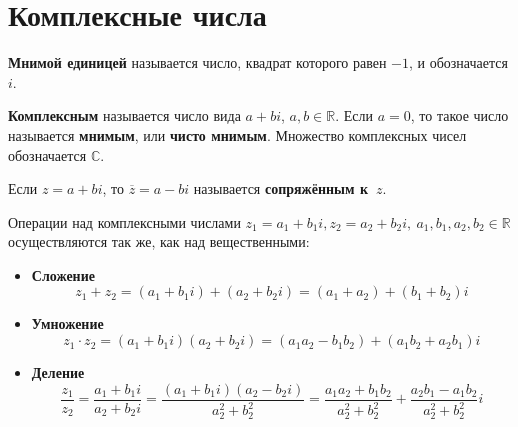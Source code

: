 \section{Комплексные числа}
 \textbf{Мнимой единицей} называется число, квадрат которого равен $-1$, и обозначается $i$.

 \textbf{Комплексным} называется число вида $a + bi$, $a, b \in \mathbb R$.
Если $a = 0$, то такое число называется \textbf{мнимым}, или \textbf{чисто мнимым}.
Множество комплексных чисел обозначается $\mathbb C$.

Если $z = a + bi$, то $\overline z = a - bi$ называется \textbf{сопряжённым к~$z$}.

Операции над комплексными числами $z_1 = a_1 + b_1 i, z_2 = a_2 + b_2 i, \ a_1, b_1, a_2, b_2 \in \mathbb R$ осуществляются так же, как над вещественными:
\begin{itemize}
	\item\textbf{Сложение}
	\begin{equation*}
	z_1 + z_2 = (a_1 + b_1 i) + (a_2 + b_2 i) = (a_1 + a_2) + (b_1 + b_2)i
	\end{equation*}
	
	\item\textbf{Умножение}
	\begin{equation*}
	z_1 \cdot z_2 = (a_1 + b_1 i)(a_2 + b_2 i) = (a_1 a_2 - b_1 b_2) + (a_1 b_2 + a_2 b_1)i
	\end{equation*}
	
	\item\textbf{Деление}
	\begin{equation*}
	\frac{z_1}{z_2} = \frac{a_1 + b_1 i}{a_2 + b_2 i} =
	\frac{(a_1 + b_1 i)(a_2 - b_2 i)}{a_2^2 + b_2^2} =
	\frac{a_1 a_2 + b_1 b_2}{a_2^2 + b_2^2} + \frac{a_2 b_1 - a_1 b_2}{a_2^2 + b_2^2} i
	\end{equation*}
\end{itemize}